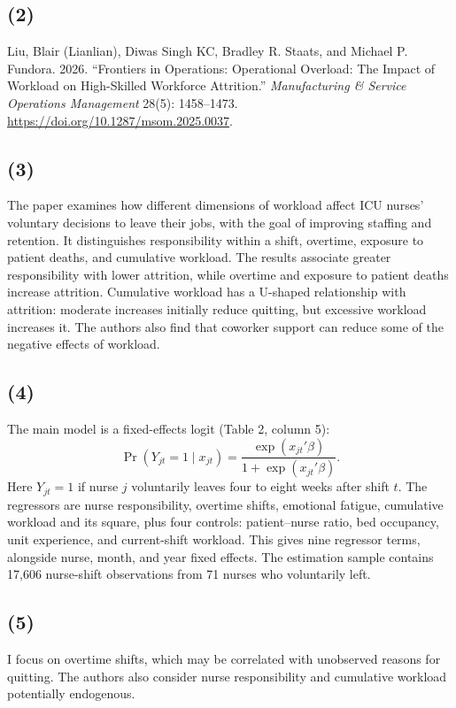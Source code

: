 \documentclass[11pt]{article}
\begin{document}
\subsection{(2)}
Liu, Blair (Lianlian), Diwas Singh KC, Bradley R. Staats, and Michael P.
Fundora. 2026. ``Frontiers in Operations: Operational Overload: The Impact
of Workload on High-Skilled Workforce Attrition.''
\emph{Manufacturing \& Service Operations Management} 28(5): 1458--1473.
\url{https://doi.org/10.1287/msom.2025.0037}.

\subsection{(3)}
The paper examines how different dimensions of workload affect ICU nurses'
voluntary decisions to leave their jobs, with the goal of improving
staffing and retention. It distinguishes responsibility within a shift,
overtime, exposure to patient deaths, and cumulative workload. The results
associate greater responsibility with lower attrition, while overtime and
exposure to patient deaths increase attrition. Cumulative workload has a
U-shaped relationship with attrition: moderate increases initially reduce
quitting, but excessive workload increases it. The authors also find that
coworker support can reduce some of the negative effects of workload.

\subsection{(4)}
The main model is a fixed-effects logit (Table 2, column 5):
\[
 \Pr(Y_{jt}=1\mid x_{jt})
 =\frac{\exp(x_{jt}'\beta)}{1+\exp(x_{jt}'\beta)}.
\]
Here $Y_{jt}=1$ if nurse $j$ voluntarily leaves four to eight weeks after
shift $t$. The regressors are nurse responsibility, overtime shifts,
emotional fatigue, cumulative workload and its square, plus four controls:
patient--nurse ratio, bed occupancy, unit experience, and current-shift
workload. This gives nine regressor terms, alongside nurse, month, and
year fixed effects. The estimation sample contains 17,606 nurse-shift
observations from 71 nurses who voluntarily left.

\subsection{(5)}
I focus on overtime shifts, which may be correlated with unobserved
reasons for quitting. The authors also consider nurse responsibility
and cumulative workload potentially endogenous.
\end{document}
